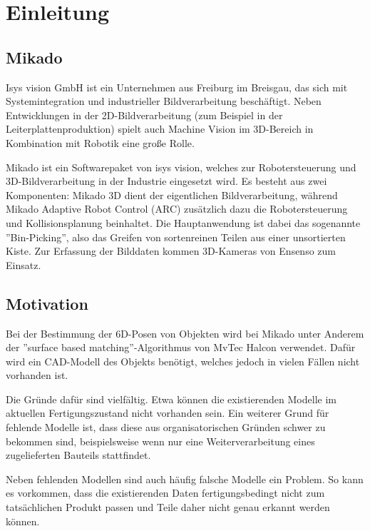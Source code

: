 
\chapter{Einleitung}
\label{ch:einleitung}


\section{Mikado}
\label{sec:mikado}

Isys vision GmbH \cite{isysWebsite} ist ein Unternehmen aus Freiburg im Breisgau, das sich mit Systemintegration und industrieller Bildverarbeitung beschäftigt.
Neben Entwicklungen in der 2D-Bildverarbeitung (zum Beispiel in der Leiterplattenproduktion) spielt auch Machine Vision im 3D-Bereich in Kombination mit Robotik eine große Rolle.


Mikado \cite{mikadoWebsite} ist ein Softwarepaket von isys vision, welches zur Robotersteuerung und 3D-Bildverarbeitung in der Industrie eingesetzt wird.
Es besteht aus zwei Komponenten: Mikado 3D dient der eigentlichen Bildverarbeitung, während Mikado Adaptive Robot Control (ARC) zusätzlich dazu die Robotersteuerung und Kollisionsplanung beinhaltet.
Die Hauptanwendung ist dabei das sogenannte ''Bin-Picking'', also das Greifen von sortenreinen Teilen aus einer unsortierten Kiste.
Zur Erfassung der Bilddaten kommen 3D-Kameras von Ensenso \cite{ensensoWebsite} zum Einsatz.


\section{Motivation}
\label{sec:motivation}

Bei der Bestimmung der 6D-Posen von Objekten wird bei Mikado unter Anderem der ''surface based matching''-Algorithmus von MvTec Halcon \cite{drost2014recognition} verwendet.
Dafür wird ein CAD-Modell des Objekts benötigt, welches jedoch in vielen Fällen nicht vorhanden ist.

Die Gründe dafür sind vielfältig.
Etwa können die existierenden Modelle im aktuellen Fertigungszustand nicht vorhanden sein.
Ein weiterer Grund für fehlende Modelle ist, dass diese aus organisatorischen Gründen schwer zu bekommen sind, beispielsweise wenn nur eine Weiterverarbeitung eines zugelieferten Bauteils stattfindet.

Neben fehlenden Modellen sind auch häufig falsche Modelle ein Problem.
So kann es vorkommen, dass die existierenden Daten fertigungsbedingt nicht zum tatsächlichen Produkt passen und Teile daher nicht genau erkannt werden können.


